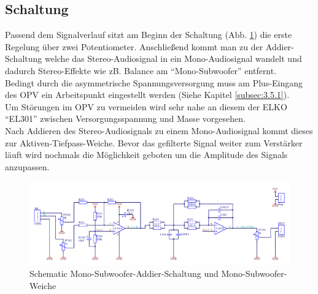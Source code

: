 \subsection{Schaltung}\label{subsec:4.2.2}
Passend dem Signalverlauf sitzt am Beginn der Schaltung (Abb. \ref{fig:4.2.2.1}) die erste Regelung über zwei Potentiometer.
Anschließend kommt man zu der Addier-Schaltung welche das Stereo-Audiosignal in ein Mono-Audiosignal wandelt und dadurch Stereo-Effekte wie zB. Balance am \enquote{Mono-Subwoofer} entfernt.\\
Bedingt durch die asymmetrische Spannungsversorgung muss am Plus-Eingang des OPV ein Arbeitspunkt eingestellt werden (Siehe Kapitel \ref{subsec:3.5.1}).\\
Um Störungen im OPV zu vermeiden wird sehr nahe an diesem der ELKO \enquote{EL301} zwischen Versorgungsspannung und Masse vorgesehen.\\
Nach Addieren des Stereo-Audiosignals zu einem Mono-Audiosignal kommt dieses zur Aktiven-Tiefpass-Weiche.
Bevor das gefilterte Signal weiter zum Verstärker läuft wird nochmals die Möglichkeit geboten um die Amplitude des Signals anzupassen.
\begin{landscape}
	\vspace*{\fill}
	\begin{figure} [H]
		\centering
		\includegraphics[width=\linewidth,height=0.9\textheight,keepaspectratio]{img/Print3/3mTTWeicheruAddiererDiplSchematic.PNG}
		\caption{Schematic Mono-Subwoofer-Addier-Schaltung und Mono-Subwoofer-Weiche}
		\label {fig:4.2.2.1}
	\end{figure}
	\vfill
\end{landscape}
\raggedbottom


